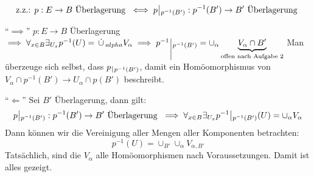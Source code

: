 \documentclass{scrartcl}
\begin{document}
\begin{aufgabe}
\[
 \text{z.z.: } p:E\to B \text{ Überlagerung } \iff p \,\vline\,_{p^{-1}(B')}:p^{-1}(B')\to B' \text{ Überlagerung }
\]
\begin{seg}{"`$\implies$"'}
 $p:E\to B$ Überlagerung $\implies \forall_{x\in B} \exists_{U_x} p^{-1}(U)=\,\dot\cup\,_{alpha} V_\alpha \implies p^{-1}\,\vline\,_{p^{-1}(B')}=\cup_\alpha \underbrace{V_\alpha\cap B'}_{\text{offen nach Aufgabe 2}}$ 
Man überzeuge sich selbst, dass $p\, \vline \,_{p^{-1}(B')}$, damit ein Homöomorphismus von $V_\alpha\cap p^{-1}(B')\to U_\alpha\cap p(B')$ beschreibt.
\end{seg}
\begin{seg}{"`$\Longleftarrow$"'}
 Sei $B'$ Überlagerung, dann gilt:
\[
p\, \vline \,_{p^{-1}(B')}: p^{-1}(B')\to B' \text{ Überlagerung } \implies \forall_{x\in B} \exists_{U_x} p^{-1}\, \vline \,_{p^{-1}(B')} (U)=\cup_\alpha V_\alpha
\]
Dann können wir die Vereinigung aller Mengen aller Komponenten betrachten:
\[
p^{-1}(U)=\cup_{B'} \cup_\alpha V_{\alpha, B'}
\]
Tatsächlich, sind die $ V_{\alpha} $ alle Homöomorphismen nach Voraussetzungen.  Damit ist alles gezeigt.
\end{seg}

\end{aufgabe}
\end{document}
